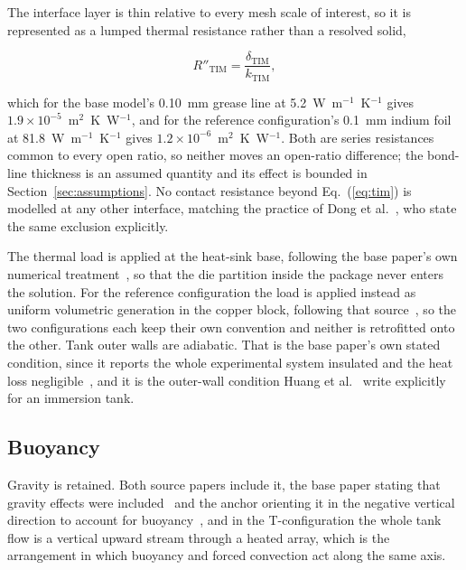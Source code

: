 The interface layer is thin relative to every mesh scale of interest, so it is represented as a
lumped thermal resistance rather than a resolved solid,

\begin{equation}
R''_{\mathrm{TIM}} = \frac{\delta_{\mathrm{TIM}}}{k_{\mathrm{TIM}}} ,
\label{eq:tim}
\end{equation}

\noindent
which for the base model's 0.10~mm grease line at 5.2~W~m$^{-1}$~K$^{-1}$ gives
$1.9\times10^{-5}$~m$^2$~K~W$^{-1}$, and for the reference configuration's 0.1~mm indium foil at
81.8~W~m$^{-1}$~K$^{-1}$ gives $1.2\times10^{-6}$~m$^2$~K~W$^{-1}$. Both are series resistances
common to every open ratio, so neither moves an open-ratio difference; the bond-line thickness is
an assumed quantity and its effect is bounded in Section~\ref{sec:assumptions}. No contact
resistance beyond Eq.~(\ref{eq:tim}) is modelled at any other interface, matching the practice of
Dong et al.~\cite{dong2026}, who state the same exclusion explicitly.

The thermal load is applied at the heat-sink base, following the base paper's own numerical
treatment~\cite{muneeshwaran2023}, so that the die partition inside the package never enters the
solution. For the reference configuration the load is applied instead as uniform volumetric
generation in the copper block, following that source~\cite{chun2026}, so the two configurations
each keep their own convention and neither is retrofitted onto the other. Tank outer walls are
adiabatic. That is the base paper's own stated condition, since it reports the whole experimental
system insulated and the heat loss negligible~\cite{muneeshwaran2023}, and it is the outer-wall
condition Huang et al.~\cite{huang2023ijhmt} write explicitly for an immersion tank.

\subsection{Buoyancy}
\label{sec:buoyancy}

Gravity is retained. Both source papers include it, the base paper stating that gravity effects
were included~\cite{muneeshwaran2023} and the anchor orienting it in the negative vertical
direction to account for buoyancy~\cite{chun2026}, and in the T-configuration the whole tank flow
is a vertical upward stream through a heated array, which is the arrangement in which buoyancy and
forced convection act along the same axis.

